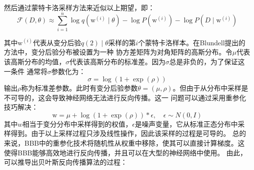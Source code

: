 然后通过蒙特卡洛采样方法来近似以上期望，即：
\begin{equation}
	\label{mtkl_sample_methoes}
	\mathcal{F}(D, \theta) \approx \sum_{i=1}^n \log q\left(\mathrm{w}^{(i)} \mid \theta\right)-\log P\left(\mathrm{w}^{(i)}\right)-\log P\left(D \mid \mathrm{w}^{(i)}\right)
\end{equation}

其中$\mathrm{w}^{(i)}$代表从变分后验$q(\mathrm{2}) \mid \theta$采样的第$i$个蒙特卡洛样本。在Blundell提出的方法中，变分后验分布被设置为一种
协方差矩阵为对角矩阵的高斯分布。令$\mu$代表该高斯分布的均值，$\sigma$代表该高斯分布的标准差。因为$\sigma$总是非负的，为了保证这一条件
通常将$\sigma$参数化为：
\begin{equation}
	\label{}
	\sigma = \log (1+\exp(\rho))
\end{equation}
输出$\rho$称为标准差参数。此时有变分后验参数$\theta=(\mu,\rho)$。但由于从分布中采样是不可导的，这会导致神经网络无法进行反向传播。这一
问题可以通过采用重参化\cite{kingma2013auto}技巧解决：
\begin{equation}
	\label{}
	\mathrm{w}=\mu+\log (1+\exp (\rho)) * \epsilon, \quad \epsilon \sim N(0, I)
\end{equation}
其中$w$相当于变分分布中采样得到的权值，$\epsilon$是噪声变量，它从标准正态分布中采样得到。由于以上采样过程只涉及线性操作，因此该采样的过程是可导的。
总的来说，BBB中的重参化技术将随机性从权重中移除，使其可以直接计算梯度。这使得BBB能够高效地进行反向传播，并且可以在大型的神经网络中使用。
由此，可以推导出贝叶斯反向传播算法的过程\cite{blundell2015weight}：
